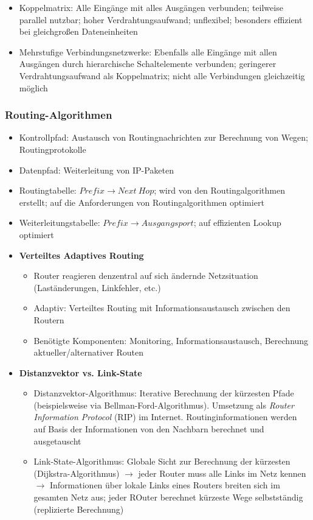\begin{itemize}
\begin{itemize}
\begin{itemize}
			\item Koppelmatrix: Alle Eingänge mit alles Ausgängen verbunden; teilweise parallel nutzbar; hoher Verdrahtungsaufwand; unflexibel; besonders effizient bei gleichgroßen Dateneinheiten
			\item Mehrstufige Verbindungsnetzwerke: Ebenfalls alle Eingänge mit allen Ausgängen durch hierarchische Schaltelemente verbunden; geringerer Verdrahtungsaufwand als Koppelmatrix; nicht alle Verbindungen gleichzeitig möglich
		\end{itemize}
	\end{itemize}
\end{itemize}

\subsubsection{Routing-Algorithmen}
\begin{itemize}
	\item Kontrollpfad: Austausch von Routingnachrichten zur Berechnung von Wegen; Routingprotokolle
	\item Datenpfad: Weiterleitung von IP-Paketen
	\item Routingtabelle: \(Prefix \rightarrow Next~Hop\); wird von den Routingalgorithmen erstellt; auf die Anforderungen von Routingalgorithmen optimiert
	\item Weiterleitungstabelle: \(Prefix \rightarrow Ausgangsport\); auf effizienten Lookup optimiert
	\item \textbf{Verteiltes Adaptives Routing}
	\begin{itemize}
		\item Router reagieren denzentral auf sich ändernde Netzsituation (Laständerungen, Linkfehler, etc.)
		\item Adaptiv: Verteiltes Routing mit Informationsaustausch zwischen den Routern
		\item Benötigte Komponenten: Monitoring, Informationsaustausch, Berechnung aktueller/alternativer Routen
	\end{itemize}
	\item \textbf{Distanzvektor vs. Link-State}
	\begin{itemize}
		\item Distanzvektor-Algorithmus: Iterative Berechnung der kürzesten Pfade (beispielsweise via Bellman-Ford-Algorithmus). Umsetzung als \textit{Router Information Protocol} (RIP) im Internet. Routinginformationen werden auf Basis der Informationen von den Nachbarn berechnet und ausgetauscht
		\item Link-State-Algorithmus: Globale Sicht zur Berechnung der kürzesten (Dijkstra-Algorithmus) \(\rightarrow\) jeder Router muss alle Links im Netz kennen \(\rightarrow\) Informationen über lokale Links eines Routers breiten sich im gesamten Netz aus; jeder ROuter berechnet kürzeste Wege selbstständig (replizierte Berechnung)
	\end{itemize}
\end{itemize}

